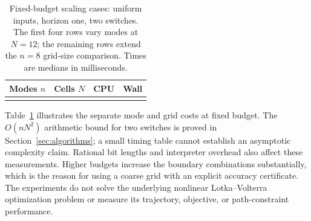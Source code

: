\begin{table}[tb]
\centering\small
\caption{Fixed-budget scaling cases: uniform inputs, horizon one, two switches.
The first four rows vary modes at $N=12$; the remaining rows extend the
$n=8$ grid-size comparison. Times are medians in milliseconds.}
\label{tab:scaling-timing}
\begin{tabular}{@{}rrrr@{}}
\toprule
Modes $n$ & Cells $N$ & CPU & Wall\\
\midrule
\\
\bottomrule
\end{tabular}
\end{table}

Table~\ref{tab:scaling-timing} illustrates the separate mode and grid costs at
fixed budget. The $O(nN^2)$ arithmetic bound for two switches is proved in
Section~\ref{sec:algorithms}; a small timing table cannot establish an
asymptotic complexity claim. Rational bit lengths and interpreter overhead
also affect these measurements. Higher budgets increase the boundary
combinations substantially, which is the reason for using a coarse grid with
an explicit accuracy certificate. The experiments do not solve the underlying
nonlinear Lotka--Volterra optimization problem or measure its trajectory,
objective, or path-constraint performance.
